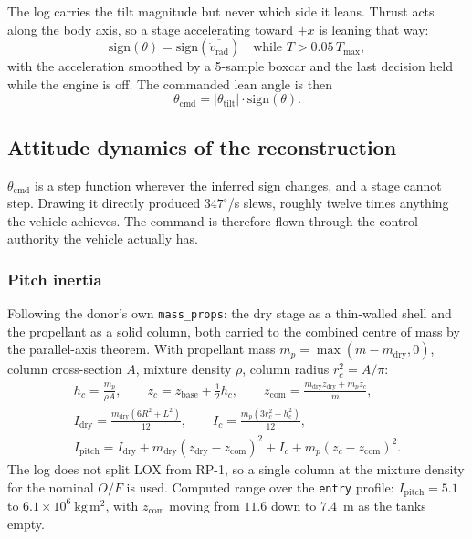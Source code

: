 \documentclass[11pt,a4paper]{article}
\newcommand{\code}[1]{\texttt{#1}}
\begin{document}
The log carries the tilt magnitude but never which side it leans. Thrust acts
along the body axis, so a stage accelerating toward $+x$ is leaning that way:
\begin{equation}
\mathrm{sign}(\theta) = \mathrm{sign}\!\left(\overline{\dot v_{\mathrm{rad}}}\right)
\quad\text{while } T>0.05\,T_{\max},
\end{equation}
with the acceleration smoothed by a 5-sample boxcar and the last decision held
while the engine is off. The commanded lean angle is then
\begin{equation}
\theta_{\mathrm{cmd}} = \lvert\theta_{\mathrm{tilt}}\rvert \cdot \mathrm{sign}(\theta).
\end{equation}

\subsection{Attitude dynamics of the reconstruction}

$\theta_{\mathrm{cmd}}$ is a step function wherever the inferred sign changes,
and a stage cannot step. Drawing it directly produced $347^\circ$/s slews,
roughly twelve times anything the vehicle achieves. The command is therefore
flown through the control authority the vehicle actually has.

\subsubsection{Pitch inertia}

Following the donor's own \code{mass\_props}: the dry stage as a thin-walled
shell and the propellant as a solid column, both carried to the combined centre
of mass by the parallel-axis theorem. With propellant mass
$m_p=\max(m-m_{\mathrm{dry}},0)$, column cross-section $A$, mixture density
$\rho$, column radius $r_c^2=A/\pi$:
\begin{gather}
h_c = \frac{m_p}{\rho A},\qquad
z_c = z_{\mathrm{base}} + \tfrac{1}{2}h_c,\qquad
z_{\mathrm{com}} = \frac{m_{\mathrm{dry}}z_{\mathrm{dry}} + m_p z_c}{m},\\[2pt]
I_{\mathrm{dry}} = \frac{m_{\mathrm{dry}}\left(6R^2+L^2\right)}{12},
\qquad
I_{c} = \frac{m_p\left(3r_c^2+h_c^2\right)}{12},\\[2pt]
I_{\mathrm{pitch}} = I_{\mathrm{dry}} + m_{\mathrm{dry}}\left(z_{\mathrm{dry}}-z_{\mathrm{com}}\right)^2
 + I_{c} + m_p\left(z_c-z_{\mathrm{com}}\right)^2 .
\end{gather}
The log does not split LOX from RP-1, so a single column at the mixture density
for the nominal $O/F$ is used. Computed range over the \code{entry} profile:
$I_{\mathrm{pitch}}=5.1$ to $6.1\times10^6\ \mathrm{kg\,m^2}$, with
$z_{\mathrm{com}}$ moving from $11.6$ down to $7.4$~m as the tanks empty.
\end{document}
